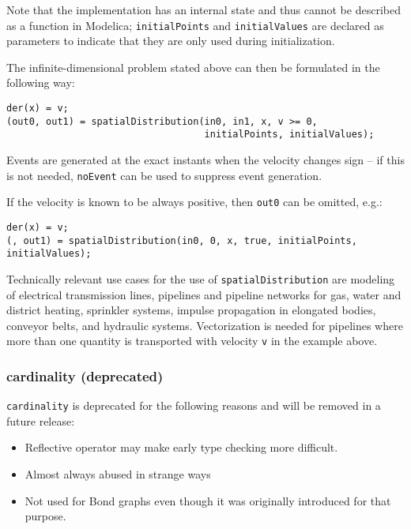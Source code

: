 \begin{nonnormative}
Note that the implementation has an internal state and thus cannot be described as a function in Modelica; \lstinline!initialPoints! and \lstinline!initialValues! are declared as parameters to indicate that they are only used during initialization.

The infinite-dimensional problem stated above can then be formulated in the following way:
\begin{lstlisting}[language=modelica]
der(x) = v;
(out0, out1) = spatialDistribution(in0, in1, x, v >= 0,
                                   initialPoints, initialValues);
\end{lstlisting}

Events are generated at the exact instants when the velocity changes sign -- if this is not needed, \lstinline!noEvent! can be used to suppress event generation.

If the velocity is known to be always positive, then \lstinline!out0! can be omitted, e.g.:
\begin{lstlisting}[language=modelica]
der(x) = v;
(, out1) = spatialDistribution(in0, 0, x, true, initialPoints, initialValues);
\end{lstlisting}
Technically relevant use cases for the use of \lstinline!spatialDistribution! are modeling of electrical transmission lines, pipelines and pipeline networks for gas, water and district heating, sprinkler systems, impulse propagation in elongated bodies, conveyor belts, and hydraulic systems.  Vectorization is needed for pipelines where more than one quantity is transported with velocity \lstinline!v! in the example above.
\end{nonnormative}

\subsubsection{cardinality (deprecated)}\label{cardinality-deprecated}

\begin{nonnormative}
\lstinline!cardinality! is deprecated for the following reasons and will be removed in a future release:
\begin{itemize}
\item
  Reflective operator may make early type checking more difficult.
\item
  Almost always abused in strange ways
\item
  Not used for Bond graphs even though it was originally introduced for that purpose.
\end{itemize}
\end{nonnormative}

